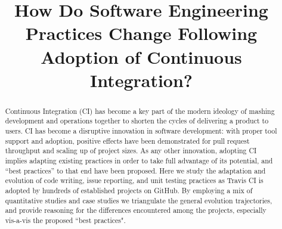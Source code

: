 \documentclass[conference]{IEEEtran}
\newcommand{\GH}{{\sc GitHub}\xspace}
\newcommand{\Tvis}{{\sc Travis CI}\xspace}
\newcommand\blfootnote[1]{%
  \begingroup
  \renewcommand\thefootnote{}\footnote{#1}%
  \addtocounter{footnote}{-1}%
  \endgroup
}
\begin{document}
\title{How Do Software Engineering Practices
Change Following Adoption of Continuous Integration?}

\maketitle
\begin{abstract}
Continuous Integration (CI)%
has become a key part of the modern ideology 
of mashing development and operations together to shorten the cycles of 
delivering a product to users. 
CI has become a disruptive innovation in software development: with proper 
tool support and adoption, positive effects have been demonstrated for pull 
request throughput and scaling up of project sizes. 
As any other innovation, adopting CI implies adapting existing practices in 
order to take full advantage of its potential, and ``best practices'' to that end 
have been proposed. 
Here we study the adaptation and evolution of code writing, issue reporting, 
and unit testing practices as \Tvis is adopted by hundreds of established 
projects on \GH. 
By employing a mix of quantitative studies and case studies we triangulate 
the general evolution trajectories, and provide reasoning for the differences 
encountered among the projects, especially vis-a-vis the proposed ``best 
practices".
\end{abstract}















\balance



\end{document}

